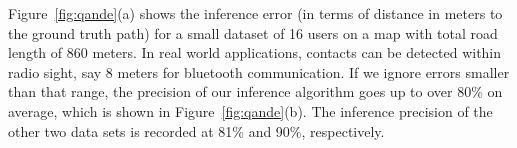 %
%
%
%
%
%

Figure~\ref{fig:qande}(a) shows the inference error (in terms of distance
in meters to the ground truth path) for a small dataset of 16 users 
on a map with total road length of 860 meters. 
In real world applications, 
contacts can be detected within radio sight, say 8 meters for bluetooth
communication. If we ignore errors smaller than that range, 
the precision of our inference algorithm goes up to over 80\%
on average, which is shown in Figure~\ref{fig:qande}(b).
The inference precision of the other two data sets is recorded at 
81\% and 90\%, respectively. 

